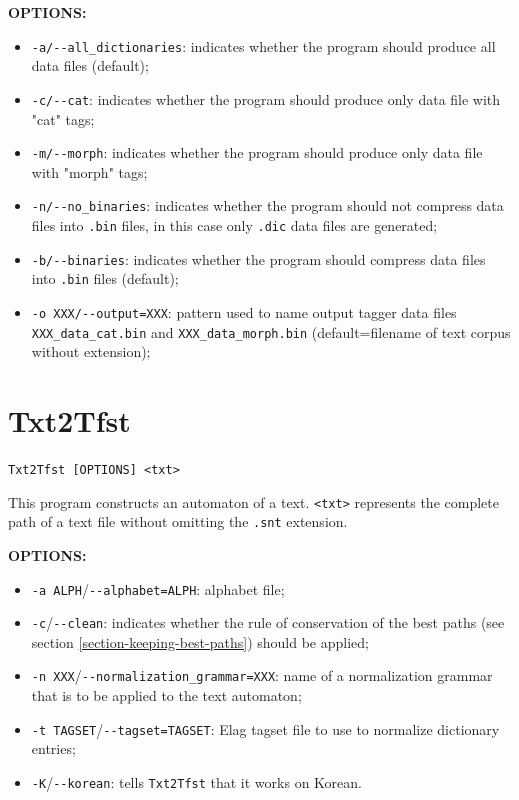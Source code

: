 \bigskip
\noindent \textbf{OPTIONS:}
\begin{itemize}
  \item \verb+-a/--all_dictionaries+: indicates whether the program should produce all data files (default);
  \item \verb+-c/--cat+: indicates whether the program should produce only data file with "cat" tags;
  \item \verb+-m/--morph+: indicates whether the program should produce only data file with "morph" tags;
  \item \verb+-n/--no_binaries+: indicates whether the program should not compress data files into
  \verb+.bin+ files, in this case only \verb+.dic+ data files are generated;
  \item \verb+-b/--binaries+: indicates whether the program should compress data files into 
  \verb+.bin+ files (default);
  \item \verb+-o XXX/--output=XXX+: pattern used to name output tagger data files \verb+XXX_data_cat.bin+
  and \verb+XXX_data_morph.bin+ (default=filename of text corpus without extension);
\end{itemize}

\bigskip

\section{Txt2Tfst} \verb+Txt2Tfst [OPTIONS] <txt>+

\bigskip
\noindent This program constructs an automaton of a text. \verb+<txt>+
represents the complete path of a text file without omitting the \verb+.snt+
extension.

\bigskip
\noindent \textbf{OPTIONS:}
\begin{itemize}
  \item \verb+-a ALPH+/\verb+--alphabet=ALPH+: alphabet file;
  
  \item \verb+-c+/\verb+--clean+: indicates whether the rule of conservation of 
  the best paths (see section \ref{section-keeping-best-paths}) 
  should be applied;
  
  \item \verb+-n XXX+/\verb+--normalization_grammar=XXX+: name of a normalization 
  grammar that is to be applied to the text automaton; 
  \item \verb+-t TAGSET+/\verb+--tagset=TAGSET+: Elag tagset file to use to
  normalize dictionary entries;
  \item \verb+-K+/\verb+--korean+: tells \verb+Txt2Tfst+ that it works on
  Korean.
\end{itemize}

